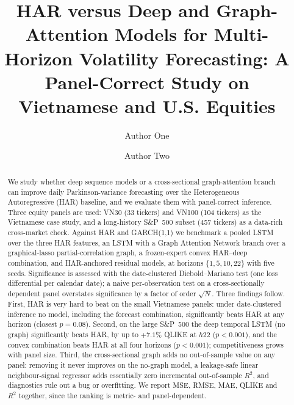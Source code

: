 \documentclass[runningheads]{llncs}
\begin{document}
\title{HAR versus Deep and Graph-Attention Models for Multi-Horizon Volatility
Forecasting: A Panel-Correct Study on Vietnamese and U.S. Equities}

\author{Author One \and Author Two}

\maketitle

\begin{abstract}
We study whether deep sequence models or a cross-sectional graph-attention branch can improve daily
Parkinson-variance forecasting over the Heterogeneous Autoregressive (HAR) baseline, and we evaluate them
with panel-correct inference. Three equity panels are used: VN30 (33 tickers) and VN100 (104 tickers) as the
Vietnamese case study, and a long-history S\&P~500 subset (457 tickers) as a data-rich cross-market check.
Against HAR and GARCH(1,1) we benchmark a pooled LSTM over the three HAR features, an LSTM with a Graph
Attention Network branch over a graphical-lasso partial-correlation graph, a frozen-expert convex HAR--deep
combination, and HAR-anchored residual models, at horizons $\{1,5,10,22\}$ with five seeds. Significance is
assessed with the date-clustered Diebold--Mariano test (one loss differential per calendar date); a naive
per-observation test on a cross-sectionally dependent panel overstates significance by a factor of order
$\sqrt{N}$. Three findings follow. First, HAR is very hard to beat on the small Vietnamese panels: under
date-clustered inference no model, including the forecast combination, significantly beats HAR at any horizon
(closest $p=0.08$). Second, on the large S\&P~500 the deep temporal LSTM (no graph) significantly beats HAR,
by up to $+7.1\%$ QLIKE at $h22$ ($p<0.001$), and the convex combination beats HAR at all four horizons
($p<0.001$); competitiveness grows with panel size. Third, the cross-sectional graph adds no out-of-sample
value on any panel: removing it never improves on the no-graph model, a leakage-safe linear neighbour-signal
regressor adds essentially zero incremental out-of-sample $R^2$, and diagnostics rule out a bug or
overfitting. We report MSE, RMSE, MAE, QLIKE and $R^2$ together, since the ranking is metric- and
panel-dependent.
\end{abstract}
\end{document}
